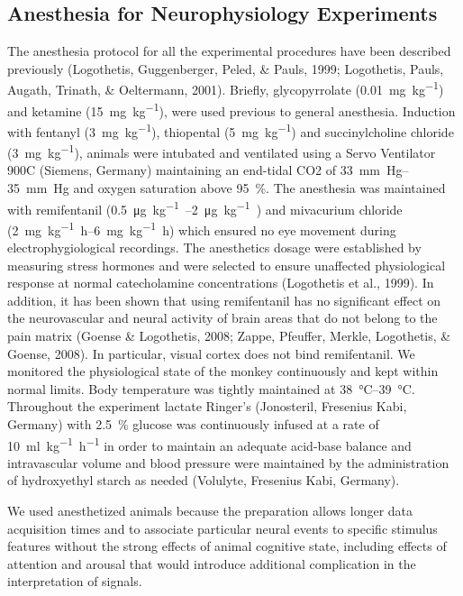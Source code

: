 \subsection{Anesthesia for Neurophysiology Experiments}
The anesthesia protocol for all the experimental procedures have been described previously (Logothetis, Guggenberger, Peled, \& Pauls, 1999; Logothetis, Pauls, Augath, Trinath, \& Oeltermann, 2001).
Briefly, glycopyrrolate (\SI{0.01}{mg.{kg}^{-1}}) and ketamine (\SI{15}{mg.{kg}^{-1}}), were used previous to general anesthesia.
Induction with fentanyl (\SI{3}{mg.{kg}^{-1}}), thiopental (\SI{5}{mg.{kg}^{-1}}) and succinylcholine chloride (\SI{3}{mg.{kg}^{-1}}), animals were intubated and ventilated using a Servo Ventilator 900C (Siemens, Germany) maintaining an end-tidal CO2 of \SIrange{33}{35}{mm.Hg} and oxygen saturation above \SI{95}{\percent}.
The anesthesia was maintained with remifentanil (\SIrange{0.5}{2}{\micro\gram.kg^{-1}.\min}) and mivacurium chloride (\SIrange{2}{6}{mg.kg^{-1}.h}) which ensured no eye movement during electrophygiological recordings.
The anesthetics dosage were established by measuring stress hormones and were selected to ensure unaffected physiological response at normal catecholamine concentrations (Logothetis et al., 1999).
In addition, it has been shown that using remifentanil has no significant effect on the neurovascular and neural activity of brain areas that do not belong to the pain matrix (Goense \& Logothetis, 2008; Zappe, Pfeuffer, Merkle, Logothetis, \& Goense, 2008).
In particular, visual cortex does not bind remifentanil.
We monitored the physiological state of the monkey continuously and kept within normal limits.
Body temperature was tightly maintained at \SIrange{38}{39}{\celsius}.
Throughout the experiment lactate Ringer's (Jonosteril, Fresenius Kabi, Germany) with \SI{2.5}{\percent} glucose was continuously infused at a rate of \SI{10}{ml.kg^{-1}.h^{-1}} in order to maintain an adequate acid-base balance and intravascular volume and blood pressure were maintained by the administration of hydroxyethyl starch as needed (Volulyte, Fresenius Kabi, Germany).


We used anesthetized animals because the preparation allows longer data acquisition times and to associate particular neural events to specific stimulus features without the strong effects of animal cognitive state, including effects of attention and arousal that would introduce additional complication in the interpretation of signals.

